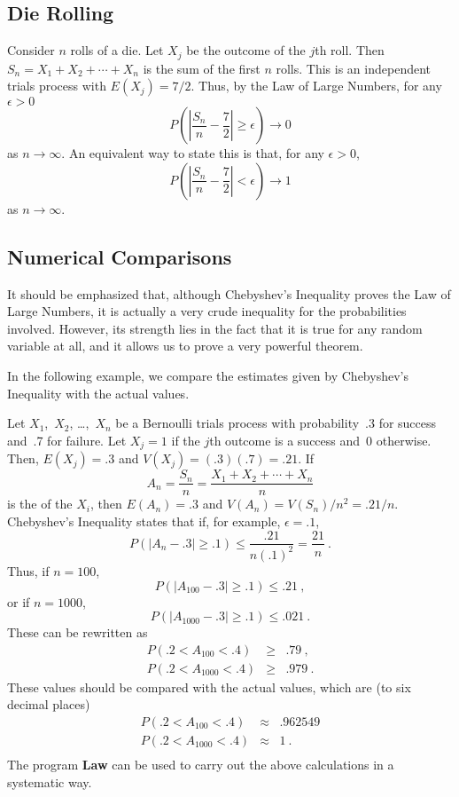 \subsection*{Die Rolling}
\begin{example}
Consider $n$ rolls of a die.  Let $X_j$ be the outcome of the $j$th roll.  Then
$S_n = X_1 + X_2 +\cdots+ X_n$ is the sum of the first $n$ rolls.  This is an
independent trials process with $E(X_j) = 7/2$.  Thus, by the Law of Large
Numbers, for any $\epsilon > 0$
$$
P\left( \left| \frac {S_n}n - \frac 72 \right| \geq \epsilon \right) \to 0
$$
as $n \rightarrow \infty$.  An equivalent way to state this is that, for any $\epsilon > 0$,
$$
P\left( \left| \frac {S_n}n - \frac 72 \right| < \epsilon \right) \to 1
$$
as $n \rightarrow \infty$.
\end{example}

\subsection*{Numerical Comparisons}
It should be emphasized that, although Chebyshev's Inequality proves the Law of Large
Numbers, it is actually a very crude inequality for the probabilities involved.  However,
its strength lies in the fact that it is true for any random variable at all, and it allows
us to prove a very powerful theorem.
\par
In the following example, we compare the estimates given by Chebyshev's Inequality with the
actual values.
\begin{example}
Let $X_1$,~$X_2$, \dots,~$X_n$ be a Bernoulli trials process with
probability~.3 for success and~.7 for failure.  Let $X_j = 1$ if the $j$th
outcome is a success and~0 otherwise.  Then, $E(X_j) = .3$ and $V(X_j) =
(.3)(.7) = .21$.  If
$$
A_n = \frac {S_n}n = \frac {X_1 + X_2 +\cdots+ X_n}n
$$
is the  of the $X_i$, then $E(A_n) = .3$ and $V(A_n) =
V(S_n)/n^2 = .21/n$.  Chebyshev's Inequality states that if, for example,
$\epsilon = .1$,
$$
P(|A_n - .3| \geq .1) \leq \frac {.21}{n(.1)^2} = \frac {21}n\ .
$$
Thus, if $n = 100$,
$$
P(|A_{100} - .3| \geq .1) \leq .21\ ,
$$
or if $n = 1000$,
$$
P(|A_{1000} - .3| \geq .1) \leq .021\ .
$$
These can be rewritten as
 \begin{eqnarray*}
P(.2 < A_{100} < .4) &\geq& .79\ , \\
P(.2 < A_{1000} < .4) &\geq& .979\ .
\end{eqnarray*} 
These values should be compared with the actual values, which are (to six decimal
places)
\begin{eqnarray*}
P(.2 < A_{100} < .4) &\approx& .962549 \\
P(.2 < A_{1000} < .4) &\approx& 1\ .\\
\end{eqnarray*}
The program {\bf Law} can be used to carry out the above calculations in a
systematic way.
\end{example}


